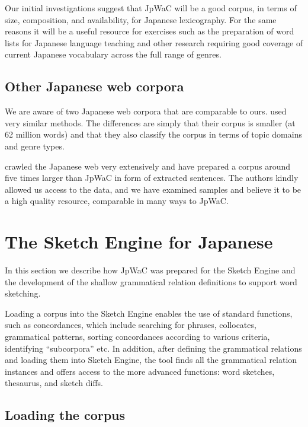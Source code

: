\documentclass[english]{jnlp_1.4}
\begin{document}
Our initial investigations suggest that JpWaC will be a good corpus,
in terms of size, composition, and availability, for Japanese
lexicography.  For the same reasons it will be a useful resource for
exercises such as the preparation of word lists for Japanese language
teaching and other research requiring good coverage of current
Japanese vocabulary across the full range of genres.


\subsection{Other Japanese web corpora}

We are aware of two Japanese web corpora that are comparable to
ours.  used very similar methods. The
differences are simply that their corpus is smaller (at 62 million
words) and that they also classify the corpus in terms of topic
domains and genre types.

 crawled the Japanese web very extensively and have
prepared a corpus around five times larger than JpWaC in form of
extracted sentences. The authors kindly allowed us access to the data,
and we have examined samples and believe it to be a high quality
resource, comparable in many ways to JpWaC.



\section{The Sketch Engine for Japanese}

In this section we describe how JpWaC was prepared for the Sketch
Engine and the development of the shallow grammatical relation
definitions to support word sketching.

Loading a corpus into the Sketch Engine enables the use of standard
functions, such as concordances, which include searching for phrases,
collocates, grammatical patterns, sorting concordances according to
various criteria, identifying ``subcorpora'' etc. In addition, after
defining the grammatical relations and loading them into Sketch
Engine, the tool finds all the grammatical relation instances and
offers access to the more advanced functions: word sketches,
thesaurus, and sketch diffs.


\subsection{Loading the corpus}
\end{document}
